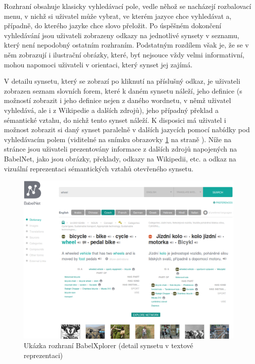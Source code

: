 \documentclass[a4paper, 11pt, oneside]{book}
\begin{document}
				Rozhraní obsahuje klasicky vyhledávací pole, vedle něhož se nacházejí rozbalovací menu, v nichž si uživatel může vybrat, ve kterém jazyce chce vyhledávat a, případně, do kterého jazyke chce slovo přeložit. Po úspěšném dokončení vyhledávání jsou uživateli zobrazeny odkazy na jednotlivé synsety v seznamu, který není nepodobný ostatním rozhraním. Podstatným rozdílem však je, že se v něm zobrazují i ilustrační obrázky, které, byť nejsouce vždy velmi informativní, mohou napomoci uživateli v orientaci, který synset jej zajímá. 

				V detailu synsetu, který se zobrazí po kliknutí na příslušný odkaz, je uživateli zobrazen seznam slovních forem, které k daném synsetu náleží, jeho definice (s možností zobrazit i jeho definice nejen z daného wordnetu, v němž uživatel vyhledává, ale i z Wikipedie a dalších zdrojů), jeho případný překlad a sémantické vztahu, do nichž tento synset náleží. K disposici má uživatel i možnost zobrazit si daný synset paralelně v dalších jazycích pomocí nabídky pod vyhledávacím polem (viditelné na snímku obrazovky \ref{fig:babelxplorer} na straně \pageref{fig:babelxplorer}). Níže na stránce jsou uživateli prezentovány informace z dalších zdrojů napojených na BabelNet, jako jsou obrázky, překlady, odkazy na Wikipedii, etc. a odkaz na vizuální reprezentaci sémantických vztahů otevřeného synsetu. 

				\begin{figure}[h]
					\centering
					\includegraphics[width=1.0\textwidth]{babelxplorer.png}
					\caption{Ukázka rozhraní BabelXplorer (detail synsetu v textové reprezentaci)}
					\label{fig:babelxplorer}
				\end{figure}
\end{document}
